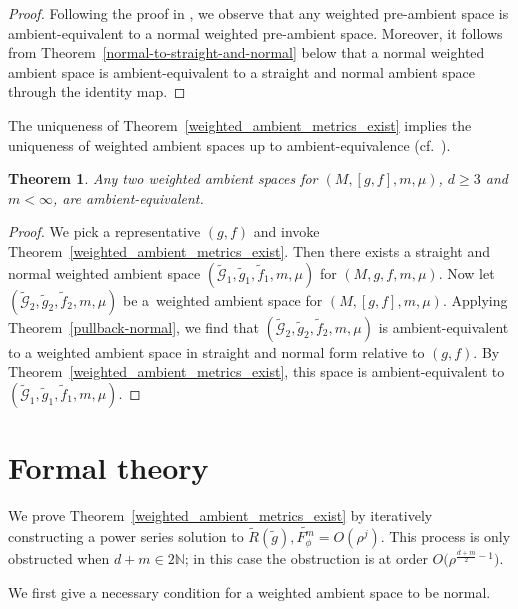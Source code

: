 \documentclass[10pt,a4paper]{amsart}
\numberwithin{equation}{section}
\newtheorem{Theorem}{Theorem}[section]
\begin{document}
\begin{proof}
Following the proof in \cite[Proposition 2.8]{FeffermanGraham2012}, we observe that any weighted pre-ambient space is ambient-equivalent to a normal weighted pre-ambient space. Moreover, it follows from Theorem~\ref{normal-to-straight-and-normal} below that a normal weighted ambient space is ambient-equivalent to a straight and normal ambient space through the identity map.
\end{proof}

The uniqueness of Theorem~\ref{weighted_ambient_metrics_exist} implies the uniqueness of weighted ambient spaces up to ambient-equivalence (cf.\ \cite[Theorem~2.9]{FeffermanGraham2012}).

\begin{Theorem}
Any two weighted ambient spaces for $(M,[g,f],m,\mu)$, $d\geq 3$ and $m<\infty$, are ambient-equivalent.
\end{Theorem}

{\sloppy\begin{proof}
We pick a representative $(g,f)$ and invoke Theorem~\ref{weighted_ambient_metrics_exist}. Then there exists a straight and normal weighted ambient space $(\widetilde{\mathcal{G}}_1,\widetilde{g}_1,\widetilde{f}_1,m,\mu)$ for $(M,g,f,m,\mu)$. Now let $(\widetilde{\mathcal{G}}_2,\widetilde{g}_2,\widetilde{f}_2,m,\mu)$ be a~weighted ambient space for $(M,[g,f],m,\mu)$. Applying Theorem~\ref{pullback-normal}, we find that $(\widetilde{\mathcal{G}}_2, \widetilde{g}_2,\widetilde{f}_2,m,\mu)$ is ambient-equivalent to a weighted ambient space in straight and normal form relative to $(g,f)$. By Theorem~\ref{weighted_ambient_metrics_exist}, this space is ambient-equivalent to $(\widetilde{\mathcal{G}}_1,\widetilde{g}_1,\widetilde{f}_1,m,\mu)$.
\end{proof}}

\section{Formal theory}\label{formal-theory}

We prove Theorem~\ref{weighted_ambient_metrics_exist} by iteratively constructing a power series solution to $\widetilde{R}(\widetilde{g}),\widetilde{F_\phi^m}=O(\rho^j)$. This process is only obstructed when $d+m\in 2\mathbb{N}$; in this case the obstruction is at order $O\big(\rho^{\frac{d+m}{2}-1}\big)$.

We first give a necessary condition for a weighted ambient space to be normal.
\end{document}
